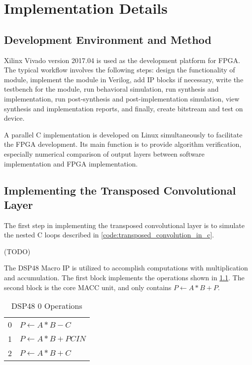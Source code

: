 
\chapter{Implementation Details}

\section{Development Environment and Method}

Xilinx Vivado version 2017.04 is used as the development platform for FPGA. The typical workflow involves
the following steps: design the functionality of module, implement the module in Verilog, add IP blocks
if necessary, write the testbench for the module, run behavioral simulation, run synthesis and implementation,
run post-synthesis and post-implementation simulation, view synthesis and implementation reports, and finally,
create bitstream and test on device.

A parallel C implementation is developed on Linux simultaneously to facilitate the FPGA development.
Its main function is to provide algorithm verification, especially numerical comparison of output layers
between software implementation and FPGA implementation.

\section{Implementing the Transposed Convolutional Layer}

The first step in implementing the transposed convolutional layer is to simulate the nested C loops
described in \ref{code:transposed_convolution_in_c}. %

(TODO)

The DSP48 Macro IP is utilized to accomplish computations with multiplication and accumulation. The first
block implements the operations shown in \ref{table:dsp48_0_operations}. The second block is the core MACC
unit, and only contains $P \leftarrow A*B+P$.

\begin{table}[h]
  \centering
  \caption{DSP48 0 Operations}
  \begin{tabular}{l | l}
    0 & $P \leftarrow A*B-C$ \\
    1 & $P \leftarrow A*B+PCIN$ \\
    2 & $P \leftarrow A*B+C$
  \end{tabular}
  \label{table:dsp48_0_operations}
\end{table}

